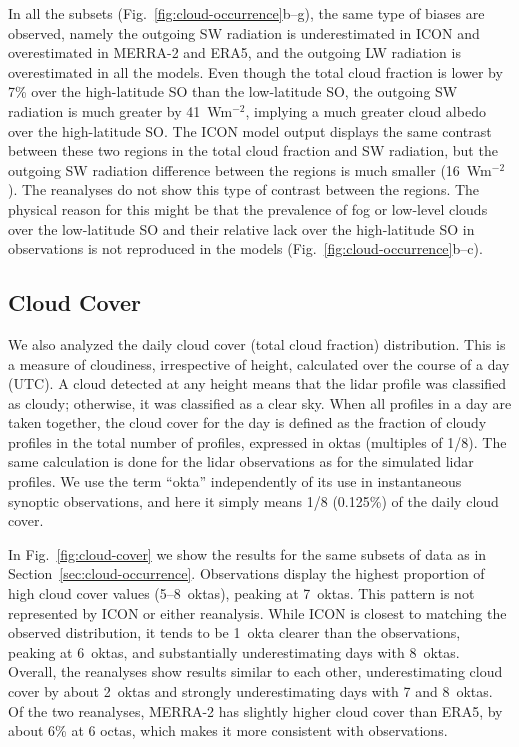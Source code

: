 \documentclass[draft]{agujournal2019}
\begin{document}
In all the subsets (Fig.~\ref{fig:cloud-occurrence}b--g), the same type of biases are observed, namely the outgoing SW radiation is underestimated in ICON and overestimated in MERRA-2 and ERA5, and the outgoing LW radiation is overestimated in all the models. Even though the total cloud fraction is lower by 7\% over the high-latitude SO than the low-latitude SO, the outgoing SW radiation is much greater by 41~Wm$^{-2}$, implying a much greater cloud albedo over the high-latitude SO. The ICON model output displays the same contrast between these two regions in the total cloud fraction and SW radiation, but the outgoing SW radiation difference between the regions is much smaller (16~Wm$^{-2}$). The reanalyses do not show this type of contrast between the regions. The physical reason for this might be that the prevalence of fog or low-level clouds over the low-latitude SO and their relative lack over the high-latitude SO in observations is not reproduced in the models (Fig.~\ref{fig:cloud-occurrence}b--c).

\subsection{Cloud Cover}
\label{sec:cloud-cover}

We also analyzed the daily cloud cover (total cloud fraction) distribution. This is a measure of cloudiness, irrespective of height, calculated over the course of a day (UTC). A cloud detected at any height means that the lidar profile was classified as cloudy; otherwise, it was classified as a clear sky. When all profiles in a day are taken together, the cloud cover for the day is defined as the fraction of cloudy profiles in the total number of profiles, expressed in oktas (multiples of 1/8). The same calculation is done for the lidar observations as for the simulated lidar profiles. We use the term ``okta'' independently of its use in instantaneous synoptic observations, and here it simply means 1/8 (0.125\%) of the daily cloud cover.

In Fig.~\ref{fig:cloud-cover} we show the results for the same subsets of data as in Section~\ref{sec:cloud-occurrence}. Observations display the highest proportion of high cloud cover values (5--8~oktas), peaking at 7~oktas. This pattern is not represented by ICON or either reanalysis. While ICON is closest to matching the observed distribution, it tends to be 1~okta clearer than the observations, peaking at 6~oktas, and substantially underestimating days with 8~oktas. Overall, the reanalyses show results similar to each other, underestimating cloud cover by about 2~oktas and strongly underestimating days with 7 and 8~oktas. Of the two reanalyses, MERRA-2 has slightly higher cloud cover than ERA5, by about 6\% at 6 octas, which makes it more consistent with observations.
\end{document}
